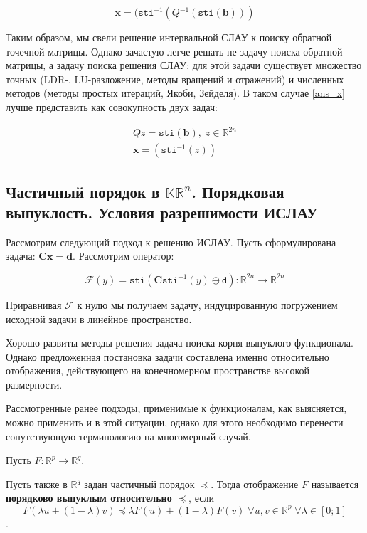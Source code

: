\begin{equation} \label{ans_x}
\mathbf{x} = (\mathtt{sti} ^ {-1}( Q\tilde{}^{-1}(\mathtt{sti}(\mathbf{b})))
\end{equation}

Таким образом, мы свели решение интервальной СЛАУ к поиску обратной точечной матрицы. Однако зачастую легче решать не задачу поиска обратной матрицы, а задачу поиска решения СЛАУ: для этой задачи существует множество точных (LDR-, LU-разложение, методы вращений и отражений) и численных методов (методы простых итераций, Якоби, Зейделя). В таком случае \ref{ans_x} лучше представить как совокупность двух задач:

\begin{align} \label{ans_b}
Q\tilde{} z = \mathtt{sti}(\mathbf{b}), \; z \in \mathbb{R}^{2n} \\
\mathbf{x} = (\mathtt{sti} ^ {-1}(z))
\end{align}

\subsection{Частичный порядок в $\mathbb{KR}^n$. Порядковая выпуклость. Условия разрешимости ИСЛАУ}

Рассмотрим следующий подход к решению ИСЛАУ.
Пусть сформулирована задача: $\mathbf{Cx}=\mathbf{d}$.
Рассмотрим оператор:

\begin{equation}
\mathcal{F}(y)=\mathtt{sti}(\mathbf{C}\mathtt{sti}^{-1}(y) \ominus \mathtt{d}): \mathbb{R}^{2n} \rightarrow \mathbb{R}^{2n}
\end{equation}

Приравнивая $\mathcal{F}$ к нулю мы получаем задачу, индуцированную погружением исходной задачи в линейное пространство.

Хорошо развиты методы решения задача поиска корня выпуклого функционала. Однако предложенная постановка задачи составлена именно относительно отображения, действующего на конечномерном пространстве высокой размерности.

Рассмотренные ранее подходы, применимые к функционалам, как выясняется, можно применить и в этой ситуации, однако для этого необходимо перенести сопутствующую терминологию на многомерный случай.

\begin{definition}
	Пусть $F: \mathbb{R}^p \rightarrow \mathbb{R}^q$.
	
	Пусть также в $\mathbb{R}^q$ задан частичный порядок $\preccurlyeq$. Тогда отображение $F$ называется \textbf{порядково выпуклым относительно $\preccurlyeq$}, если
	\begin{equation*}
	F(\lambda u + (1 - \lambda) v) \preccurlyeq \lambda F(u) + (1 - \lambda) F(v) \; \forall u, v \in \mathbb{R}^p \; \forall \lambda \in [0; 1]
	\end{equation*}.
\end{definition}

